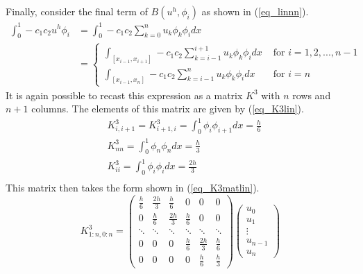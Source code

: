 \documentclass[11pt,fleqn]{article}
\theoremstyle{defstyle}
\begin{document}
Finally, consider the final term of $B(u^h, \phi_i)$ as shown in (\ref{eq_linnn}).
\begin{equation}
\begin{aligned}
\int_0^1 -c_1c_2u^h\phi_i &= \int_0^1 - c_1c_2\sum_{k=0}^{n} u_k\phi_k\phi_i dx \\
&= \begin{cases}
\int_{[x_{i-1},x_{i+1}]}-c_1c_2\sum_{k=i-1}^{i+1} u_k\phi_k\phi_idx &\text{ for } i=1,2,..., n-1 \\
\int_{[x_{i-1},x_{n}]}-c_1c_2\sum_{k=i-1}^{n} u_k\phi_k\phi_idx &\text{ for } i=n
\end{cases}
\end{aligned}
\label{eq_linnn}
\end{equation}
It is again possible to recast this expression as a matrix $K^3$ with $n$ rows and $n+1$ columns. The elements of this matrix are given by (\ref{eq_K3lin}).
\begin{equation}
\begin{aligned}
&K^3_{i,i+1}=K^3_{i+1,i}=\int^1_0 \phi_i\phi_{i+1}dx = \frac{h}{6} \\
&K^3_{nn} = \int^1_0 \phi_n\phi_{n}dx = \frac{h}{3} \\
&K^3_{ii} = \int^1_0 \phi_i\phi_{i}dx = \frac{2h}{3} \\
\end{aligned}
\label{eq_K3lin}
\end{equation}
This matrix then takes the form shown in (\ref{eq_K3matlin}).
\begin{equation}
K^3_{1:n,0:n} = \begin{pmatrix}
\frac{h}{6} & \frac{2h}{3} & \frac{h}{6} & 0 & 0 &  0\\
0 & \frac{h}{6} & \frac{2h}{3} & \frac{h}{6} & 0 & 0  \\
\ddots & \ddots & \ddots & \ddots & \ddots & \ddots \\
0 & 0 & 0  & \frac{h}{6}& \frac{2h}{3} & \frac{h}{6} \\
0 & 0 & 0 & 0 &\frac{h}{6} & \frac{h}{3}   
\end{pmatrix}
\begin{pmatrix}
u_0 \\ u_1 \\ \vdots \\ u_{n-1} \\ u_n
\end{pmatrix}
\label{eq_K3matlin}
\end{equation} 
\end{document}
